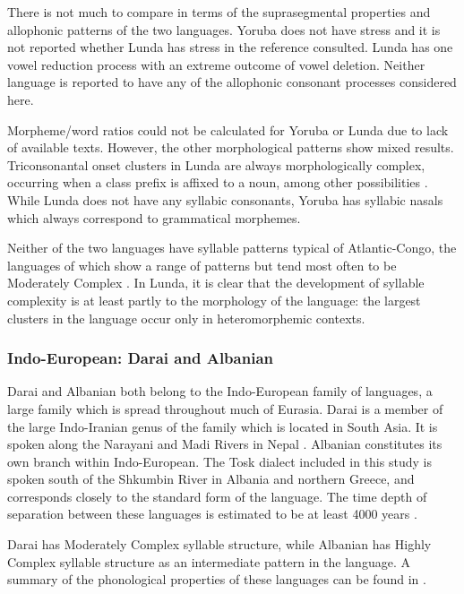   There is not much to compare in terms of the suprasegmental properties and allophonic patterns of the two languages. Yoruba does not have stress and it is not reported whether Lunda has stress in the reference consulted. Lunda has one vowel reduction process with an extreme outcome of vowel deletion. Neither language is reported to have any of the allophonic consonant processes considered here.

  Morpheme/word ratios could not be calculated for Yoruba or Lunda due to lack of available texts. However, the other morphological patterns show mixed results. Triconsonantal onset clusters in Lunda are always morphologically complex, occurring when a class prefix is affixed to a noun, among other possibilities \citep[23-24]{Kawasha2003}. While Lunda does not have any syllabic consonants, Yoruba has syllabic nasals which always correspond to grammatical morphemes.

  Neither of the two languages have syllable patterns typical of Atlantic-Congo, the languages of which show a range of patterns but tend most often to be Moderately Complex \citep{Maddieson2013a}. In Lunda, it is clear that the development of syllable complexity is at least partly to the morphology of the language: the largest clusters in the language occur only in heteromorphemic contexts.

\subsubsection{{Indo-European:} {Darai} {and} {Albanian}}\label{sec:8.4.3.5}

  Darai and Albanian both belong to the Indo-European family of languages, a large family which is spread throughout much of Eurasia. Darai is a member of the large Indo-Iranian genus of the family which is located in South Asia. It is spoken along the Narayani and Madi Rivers in Nepal \citep{Dhakal2012}. Albanian constitutes its own branch within Indo-European. The Tosk dialect included in this study is spoken south of the Shkumbin River in Albania and northern Greece, and corresponds closely to the standard form of the language. The time depth of separation between these languages is estimated to be at least 4000 years \citep[146]{Garrett2006}.

  Darai has Moderately Complex syllable structure, while Albanian has Highly Complex syllable structure as an intermediate pattern in the language. A summary of the phonological properties of these languages can be found in .

